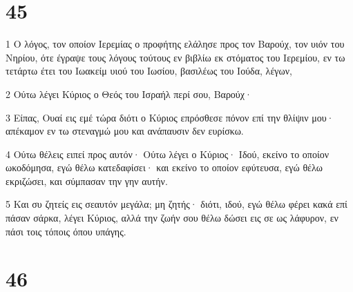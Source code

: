 \chapter{45}

\par 1 Ο λόγος, τον οποίον Ιερεμίας ο προφήτης ελάλησε προς τον Βαρούχ, τον υιόν του Νηρίου, ότε έγραψε τους λόγους τούτους εν βιβλίω εκ στόματος του Ιερεμίου, εν τω τετάρτω έτει του Ιωακείμ υιού του Ιωσίου, βασιλέως του Ιούδα, λέγων,
\par 2 Ούτω λέγει Κύριος ο Θεός του Ισραήλ περί σου, Βαρούχ·
\par 3 Είπας, Ουαί εις εμέ τώρα διότι ο Κύριος επρόσθεσε πόνον επί την θλίψιν μου· απέκαμον εν τω στεναγμώ μου και ανάπαυσιν δεν ευρίσκω.
\par 4 Ούτω θέλεις ειπεί προς αυτόν· Ούτω λέγει ο Κύριος· Ιδού, εκείνο το οποίον ωκοδόμησα, εγώ θέλω κατεδαφίσει· και εκείνο το οποίον εφύτευσα, εγώ θέλω εκριζώσει, και σύμπασαν την γην αυτήν.
\par 5 Και συ ζητείς εις σεαυτόν μεγάλα; μη ζητής· διότι, ιδού, εγώ θέλω φέρει κακά επί πάσαν σάρκα, λέγει Κύριος, αλλά την ζωήν σου θέλω δώσει εις σε ως λάφυρον, εν πάσι τοις τόποις όπου υπάγης.

\chapter{46}

